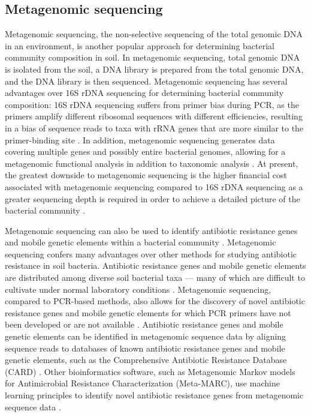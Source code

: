 \subsection{Metagenomic sequencing}

Metagenomic sequencing, the non-selective sequencing of the total genomic DNA in an environment, is another popular approach for determining bacterial community composition in soil.
In metagenomic sequencing, total genomic DNA is isolated from the soil, a DNA library is prepared from the total genomic DNA, and the DNA library is then sequenced.
Metagenomic sequencing has several advantages over 16S rDNA sequencing for determining bacterial community composition:
16S rDNA sequencing suffers from primer bias during PCR, as the primers amplify different ribosomal sequences with different efficiencies, resulting in a bias of sequence reads to taxa with rRNA genes that are more similar to the primer-binding site \parencite{Tremblay.2015}.
In addition, metagenomic sequencing generates data covering multiple genes and possibly entire bacterial genomes, allowing for a metagenomic functional analysis in addition to taxonomic analysis \parencite{Li.2015c}.
At present, the greatest downside to metagenomic sequencing is the higher financial cost associated with metagenomic sequencing compared to 16S rDNA sequencing as a greater sequencing depth is required in order to achieve a detailed picture of the bacterial community \parencite{Scholz.2012}.

Metagenomic sequencing can also be used to identify antibiotic resistance genes and mobile genetic elements within a bacterial community \parencite{Boolchandani.2019}.
Metagenomic sequencing confers many advantages over other methods for studying antibiotic resistance in soil bacteria.
Antibiotic resistance genes and mobile genetic elements are distributed among diverse soil bacterial taxa --- many of which are difficult to cultivate under normal laboratory conditions \parencite{Dunivin.2019}.
Metagenomic sequencing, compared to PCR-based methods, also allows for the discovery of novel antibiotic resistance genes and mobile genetic elements for which PCR primers have not been developed or are not available \parencite{Boolchandani.2019}.
Antibiotic resistance genes and mobile genetic elements can be identified in metagenomic sequence data by aligning sequence reads to databases of known antibiotic resistance genes and mobile genetic elements, such as the Comprehensive Antibiotic Resistance Database (\gls{CARD}) \parencite{Alcock.2020}.
Other bioinformatics software, such as Metagenomic Markov models for Antimicrobial Resistance Characterization (\gls{Meta-MARC}), use machine learning principles to identify novel antibiotic resistance genes from metagenomic sequence data \parencite{Lakin.2019}.

